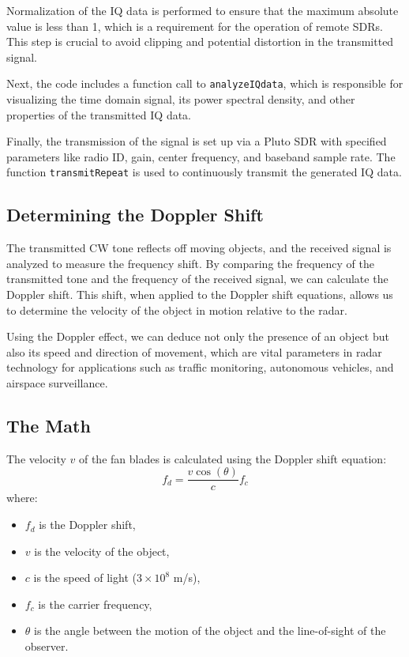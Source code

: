 \documentclass[12pt]{article}
\begin{document}
Normalization of the IQ data is performed to ensure that the maximum absolute value is less than 1, which is a requirement for the operation of remote SDRs. This step is crucial to avoid clipping and potential distortion in the transmitted signal.

Next, the code includes a function call to \texttt{analyzeIQdata}, which is responsible for visualizing the time domain signal, its power spectral density, and other properties of the transmitted IQ data.

Finally, the transmission of the signal is set up via a Pluto SDR with specified parameters like radio ID, gain, center frequency, and baseband sample rate. The function \texttt{transmitRepeat} is used to continuously transmit the generated IQ data.

\subsection{Determining the Doppler Shift}

The transmitted CW tone reflects off moving objects, and the received signal is analyzed to measure the frequency shift. By comparing the frequency of the transmitted tone and the frequency of the received signal, we can calculate the Doppler shift. This shift, when applied to the Doppler shift equations, allows us to determine the velocity of the object in motion relative to the radar.

Using the Doppler effect, we can deduce not only the presence of an object but also its speed and direction of movement, which are vital parameters in radar technology for applications such as traffic monitoring, autonomous vehicles, and airspace surveillance.
\subsection{The Math}
The velocity \( v \) of the fan blades is calculated using the Doppler shift equation:
\[
f_d = \frac{v \cos(\theta)}{c} f_c
\]
where:
\begin{itemize}
    \item \( f_d \) is the Doppler shift,
    \item \( v \) is the velocity of the object,
    \item \( c \) is the speed of light (\(3 \times 10^8\) m/s),
    \item \( f_c \) is the carrier frequency,
    \item \( \theta \) is the angle between the motion of the object and the line-of-sight of the observer.
\end{itemize}
\end{document}
